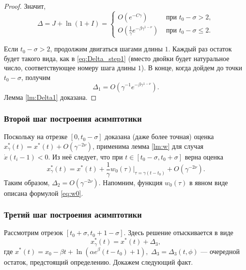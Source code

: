 \begin{proof}
Значит,
\begin{equation}
	\label{eq:Delta_step1}
\Delta = J + \ln(1 + I) = 
\begin{cases}
	O(e^{-C \gamma}) & \text{ при } t_0 - \sigma > 2,\\
	O(\frac{1}{\gamma} e^{-\beta \gamma^{1 - \nu}}) & \text{ при } t_0 - \sigma \leq 2.
\end{cases}
\end{equation}

Если $t_0 - \sigma > 2$, продолжим двигаться шагами длины $1$. Каждый раз остаток будет такого вида, как в \eqref{eq:Delta_step1} (вместо двойки будет натуральное число, соответствующее номеру шага длины $1$). В конце, когда дойдем до точки $t_0 - \sigma$, получим
%
\[
\Delta_1=O(\gamma^{-1} e^{-\beta\gamma^{1 - \nu}}).
\]
%
Лемма \ref{lm:Delta1} доказана.

\end{proof}

\subsubsection{Второй шаг построения асимптотики}
Поскольку на отрезке $[0, t_0 - \sigma]$ доказана (даже более точная) оценка $x^*_\gamma(t) = x^*(t) + O(\gamma^{-2\nu})$, применима лемма \ref{lm:w} для случая $\dot{x}(t_i - 1) < 0$. Из неё следует, что при $t \in [t_0 - \sigma, t_0 + \sigma]$ верна оценка
\[
x^*_\gamma(t) = x^*(t) + \dfrac{1}{\gamma}w_0(\tau)\bigg\vert_{\tau = \gamma(t - t_0)} + O(\gamma^{-2\nu}).
\]
%
Таким образом, $\Delta_2 = O(\gamma^{-2\nu}).$ Напомним, функция $w_0(\tau)$ в явном виде описана формулой \ref{eq:w0}.

\subsubsection{Третий шаг построения асимптотики}
Рассмотрим отрезок $[t_0 + \sigma, t_0 + 1 - \sigma]$. Здесь решение отыскивается в виде
\begin{equation}
	\label{eq:sol_3}
	x_\gamma^*(t) = x^*(t) + \Delta_3,
\end{equation}
где $x^*(t) = x_0 - \beta t +\ln(\alpha e^{\beta}(t - t_0)+1),$ $\Delta_3 = \Delta_3(t, \phi)$ --- очередной остаток, предстоящий определению. Докажем следующий факт.


